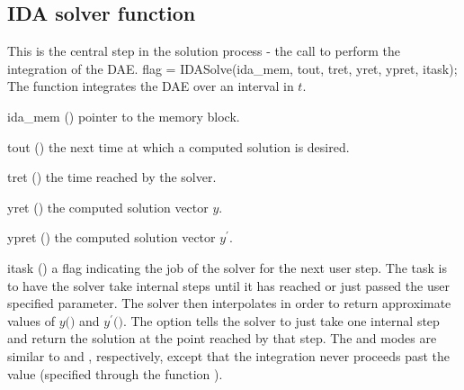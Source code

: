 \subsection{IDA solver function}\label{sss:idasolve}
%
This is the central step in the solution process - the call to perform the integration 
of the DAE.
%
{
  flag = IDASolve(ida\_mem, tout, tret, yret, ypret, itask);
}
{
  The function  integrates the DAE over an interval in $t$.
}
{
  \begin{args}
  \item[ida\_mem] ()
    pointer to the {\ida} memory block.
  \item[tout] ()
    the next time at which a computed solution is desired.
  \item[tret] ()
    the time reached by the solver.
  \item[yret] ()
    the computed solution vector $y$.
  \item[ypret] ()
    the computed solution vector $y^\prime$.
  \item[itask] ()
    a flag indicating the job of the solver for the next user step. 
    The  task is to have the solver take internal steps until   
    it has reached or just passed the user specified 
    parameter. The solver then interpolates in order to   
    return approximate values of $y($$)$ and $y^\prime($$)$. 
    The  option tells the solver to just take one internal step  
    and return the solution at the point reached by that step. 
    The  and  modes are     
    similar to  and , respectively, except    
    that the integration never proceeds past the value      
     (specified through the function ).
  \end{args}
}
